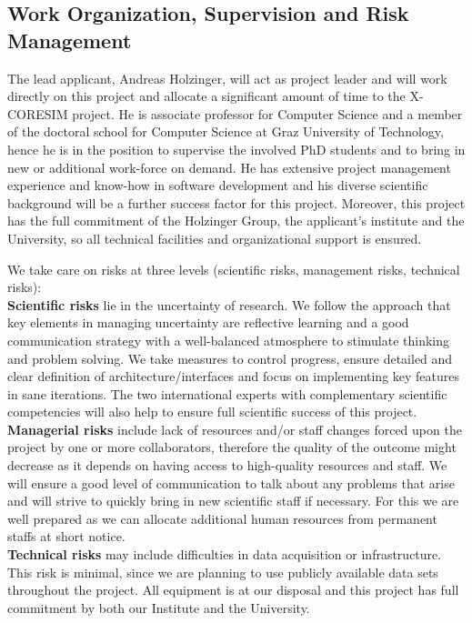 \documentclass[a4paper,11pt]{article}
\begin{document}
\subsection{Work Organization, Supervision and Risk Management}

The lead applicant, Andreas Holzinger, will act as project leader and will work directly on this project and allocate a significant amount of time to the X-CORESIM project. He is associate professor for Computer Science and a member of the doctoral school for Computer Science at Graz University of Technology, hence he is in the position to supervise the involved PhD students and to bring in new or additional work-force on demand.  He has extensive project management experience and know-how in software development and his diverse scientific background will be a further success factor for this project. Moreover, this project has the full commitment of the Holzinger Group, the applicant's institute and the University, so all technical facilities and organizational support is ensured.

We take care on risks at three levels (scientific risks, management risks, technical risks):
\\[0,2cm]
\textbf{Scientific risks} lie in the uncertainty of research. We follow the approach that key elements in managing uncertainty are reflective learning and a good communication strategy with a well-balanced atmosphere to stimulate thinking and problem solving. We take measures to control progress, ensure detailed and clear definition of architecture/interfaces and focus on implementing key features in sane iterations. The two international experts with complementary scientific competencies will also help to ensure full scientific success of this project. 
\\[0,2cm]
\textbf{Managerial risks} include lack of resources and/or staff changes forced upon the project by one or more collaborators, therefore the quality of the outcome might decrease as it depends on having access to high-quality resources and staff. We will ensure a good level of communication to talk about any problems that arise and will strive to quickly bring in new scientific staff if necessary. For this we are well prepared as we can allocate additional human resources from permanent staffs at short notice.
\\[0,2cm]
\textbf{Technical risks} may include difficulties in data acquisition or infrastructure. This risk is minimal, since we are planning to use publicly available data sets throughout the project. All equipment is at our disposal and this project has full commitment by both our Institute and the University.
\end{document}
